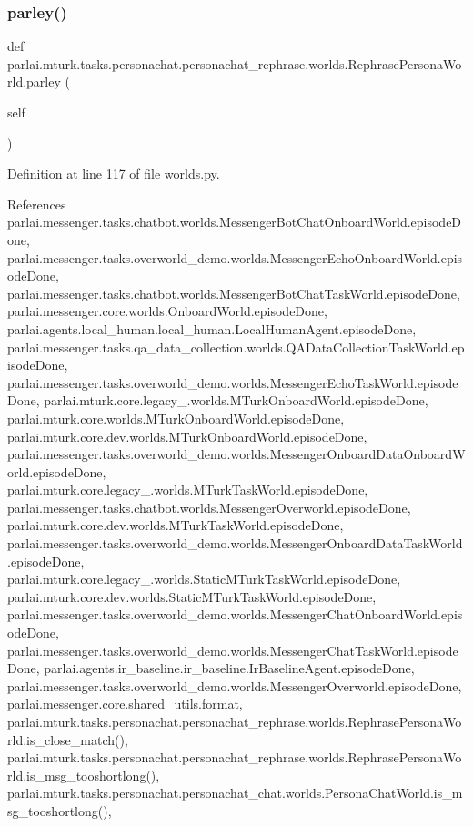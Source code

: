 \subsubsection{\texorpdfstring{parley()}{parley()}}
{\footnotesize\ttfamily def parlai.\+mturk.\+tasks.\+personachat.\+personachat\+\_\+rephrase.\+worlds.\+Rephrase\+Persona\+World.\+parley (\begin{DoxyParamCaption}\item[{}]{self }\end{DoxyParamCaption})}



Definition at line 117 of file worlds.\+py.



References parlai.\+messenger.\+tasks.\+chatbot.\+worlds.\+Messenger\+Bot\+Chat\+Onboard\+World.\+episode\+Done, parlai.\+messenger.\+tasks.\+overworld\+\_\+demo.\+worlds.\+Messenger\+Echo\+Onboard\+World.\+episode\+Done, parlai.\+messenger.\+tasks.\+chatbot.\+worlds.\+Messenger\+Bot\+Chat\+Task\+World.\+episode\+Done, parlai.\+messenger.\+core.\+worlds.\+Onboard\+World.\+episode\+Done, parlai.\+agents.\+local\+\_\+human.\+local\+\_\+human.\+Local\+Human\+Agent.\+episode\+Done, parlai.\+messenger.\+tasks.\+qa\+\_\+data\+\_\+collection.\+worlds.\+Q\+A\+Data\+Collection\+Task\+World.\+episode\+Done, parlai.\+messenger.\+tasks.\+overworld\+\_\+demo.\+worlds.\+Messenger\+Echo\+Task\+World.\+episode\+Done, parlai.\+mturk.\+core.\+legacy\+\_.\+worlds.\+M\+Turk\+Onboard\+World.\+episode\+Done, parlai.\+mturk.\+core.\+worlds.\+M\+Turk\+Onboard\+World.\+episode\+Done, parlai.\+mturk.\+core.\+dev.\+worlds.\+M\+Turk\+Onboard\+World.\+episode\+Done, parlai.\+messenger.\+tasks.\+overworld\+\_\+demo.\+worlds.\+Messenger\+Onboard\+Data\+Onboard\+World.\+episode\+Done, parlai.\+mturk.\+core.\+legacy\+\_.\+worlds.\+M\+Turk\+Task\+World.\+episode\+Done, parlai.\+messenger.\+tasks.\+chatbot.\+worlds.\+Messenger\+Overworld.\+episode\+Done, parlai.\+mturk.\+core.\+dev.\+worlds.\+M\+Turk\+Task\+World.\+episode\+Done, parlai.\+messenger.\+tasks.\+overworld\+\_\+demo.\+worlds.\+Messenger\+Onboard\+Data\+Task\+World.\+episode\+Done, parlai.\+mturk.\+core.\+legacy\+\_.\+worlds.\+Static\+M\+Turk\+Task\+World.\+episode\+Done, parlai.\+mturk.\+core.\+dev.\+worlds.\+Static\+M\+Turk\+Task\+World.\+episode\+Done, parlai.\+messenger.\+tasks.\+overworld\+\_\+demo.\+worlds.\+Messenger\+Chat\+Onboard\+World.\+episode\+Done, parlai.\+messenger.\+tasks.\+overworld\+\_\+demo.\+worlds.\+Messenger\+Chat\+Task\+World.\+episode\+Done, parlai.\+agents.\+ir\+\_\+baseline.\+ir\+\_\+baseline.\+Ir\+Baseline\+Agent.\+episode\+Done, parlai.\+messenger.\+tasks.\+overworld\+\_\+demo.\+worlds.\+Messenger\+Overworld.\+episode\+Done, parlai.\+messenger.\+core.\+shared\+\_\+utils.\+format, parlai.\+mturk.\+tasks.\+personachat.\+personachat\+\_\+rephrase.\+worlds.\+Rephrase\+Persona\+World.\+is\+\_\+close\+\_\+match(), parlai.\+mturk.\+tasks.\+personachat.\+personachat\+\_\+rephrase.\+worlds.\+Rephrase\+Persona\+World.\+is\+\_\+msg\+\_\+tooshortlong(), parlai.\+mturk.\+tasks.\+personachat.\+personachat\+\_\+chat.\+worlds.\+Persona\+Chat\+World.\+is\+\_\+msg\+\_\+tooshortlong(), 